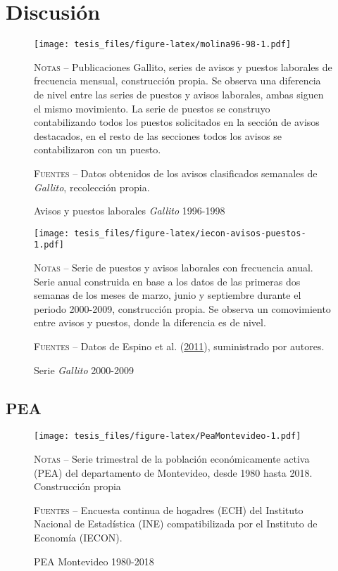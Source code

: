\documentclass[12pt,oneside]{reedthesis}
\makeatletter
\def\maxwidth{ %
  \ifdim\Gin@nat@width>\linewidth
    \linewidth
  \else
    \Gin@nat@width
  \fi
}
\makeatother
\begin{document}
\hypertarget{discusiuxf3n}{%
\section{Discusión}\label{discusiuxf3n}}
\begin{figure}
\texttt{[image: tesis\_files/figure-latex/molina96-98-1.pdf]}
\caption{Avisos y puestos laborales \textit{Gallito} 1996-1998}\label{fig:molina96-98}\textsc{}

\footnotesize\textsc{Notas} -- Publicaciones Gallito, series de avisos y puestos laborales de frecuencia mensual, construcción propia. Se observa una diferencia de nivel entre las series de puestos y avisos laborales, ambas siguen el mismo movimiento. La serie de puestos se construyo contabilizando todos los puestos solicitados en la sección de avisos destacados, en el resto de las secciones todos los avisos se contabilizaron con un puesto.

\textsc{Fuentes} -- Datos obtenidos de los avisos clasificados semanales de \textit{Gallito}, recolección propia.
\end{figure}

\begin{figure}
\texttt{[image: tesis\_files/figure-latex/iecon-avisos-puestos-1.pdf]}
\caption{Serie \textit{Gallito} 2000-2009}\label{fig:iecon-avisos-puestos}\textsc{}

\footnotesize\textsc{Notas} -- Serie de puestos y avisos laborales con frecuencia anual. Serie anual construida en base a los datos de las primeras dos semanas de los meses de marzo, junio y septiembre durante el periodo 2000-2009, construcción propia. Se observa un comovimiento entre avisos y puestos, donde la diferencia es de nivel.

\textsc{Fuentes} -- Datos de Espino et al. (\protect\hyperlink{ref-Alma2011}{2011}), suministrado por autores.
\end{figure}
\newpage

\hypertarget{pea}{%
\subsection{PEA}\label{pea}}
\begin{figure}
\texttt{[image: tesis\_files/figure-latex/PeaMontevideo-1.pdf]}
\caption{PEA Montevideo 1980-2018}\label{fig:PeaMontevideo}\textsc{}

\footnotesize\textsc{Notas} -- Serie trimestral de la población económicamente activa (PEA) del departamento de Montevideo, desde 1980 hasta 2018. Construcción propia

\textsc{Fuentes} -- Encuesta continua de hogadres (ECH) del Instituto Nacional de Estadística (INE) compatibilizada por el Instituto de Economía (IECON).
\end{figure}

\end{document}

